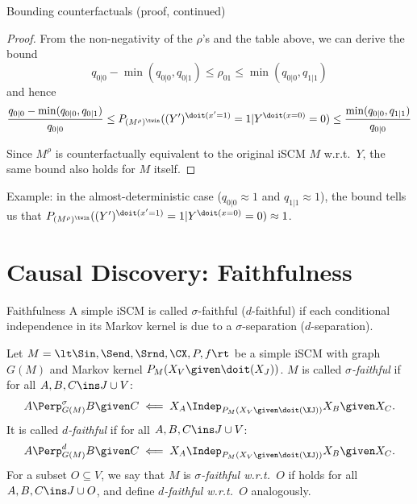 \begin{frame}{Bounding counterfactuals (proof, continued)}
  \begin{proof}
From the non-negativity of the $\rho$'s and the table above, we can derive the bound
$$q_{0|0} - \min(q_{0|0},q_{0|1}) \le \rho_{01} \le \min(q_{0|0},q_{1|1})$$
and hence
{\small $$\frac{q_{0|0} - \min(q_{0|0},q_{0|1})}{q_{0|0}} \le P_{(M^{\rho})^\twin}((Y')^{\doit(x'=1)} = 1 | Y^{\doit(x=0)}=0) \le \frac{\min(q_{0|0},q_{1|1})}{q_{0|0}}$$}

Since $M^\rho$ is counterfactually equivalent to the original iSCM $M$ w.r.t.\ $Y$, the same bound also holds for $M$ itself.
  \end{proof}

\bigskip 
Example: in the almost-deterministic case ($q_{0|0} \approx 1$ and $q_{1|1} \approx 1$),
  the bound tells us that $P_{(M^{\rho})^\twin}((Y')^{\doit(x'=1)} = 1 | Y^{\doit(x=0)}=0) \approx 1$.
\end{frame}



\part{Causal Discovery: Faithfulness}
\frame{\partpage}

\begin{frame}{Faithfulness}
A simple iSCM is called $\sigma$-faithful ($d$-faithful) if each conditional independence in its Markov kernel
is due to a $\sigma$-separation ($d$-separation).
\begin{Def}[\ref{def:faithfulness}]
  Let $M = \lt \Sin, \Send, \Srnd, \CX, P, f \rt$ be a simple iSCM with graph $G(M)$
  and Markov kernel $P_{M}(X_V \given \doit(X_J))$.
  $M$ is called \emph{$\sigma$-faithful} if 
  for all $A, B, C \ins J \cup V$:
  \begin{equation}\label{slides:eq:sigma_faithful}
    A \Perp^\sigma_{G(M)} B \given C \impliedby X_A \Indep_{P_{M}(X_V \given \doit(\XJ))} X_B \given X_C.
  \end{equation}
  It is called \emph{$d$-faithful} if
  for all $A, B, C \ins J \cup V$:
  \begin{equation*}
    A \Perp^d_{G(M)} B \given C \impliedby X_A \Indep_{P_{M}(X_V \given \doit(\XJ))} X_B \given X_C.
  \end{equation*}
  For a subset $O \subseteq V$, we say that $M$ is \emph{$\sigma$-faithful w.r.t.\ $O$} if
   holds for all $A, B, C \ins J \cup O$, and define
  \emph{$d$-faithful w.r.t.\ $O$} analogously.
\end{Def}
\end{frame}


